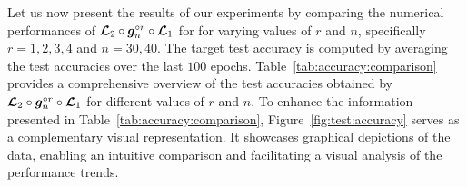 \documentclass[nohyperref]{article}
\theoremstyle{plain}
\theoremstyle{definition}
\theoremstyle{remark}
\begin{document}
Let us now present the results of our experiments by comparing the numerical performances of ${\bm{\mathcal{L}}}_2\circ {\bm{g}}_n^{\circ r}\circ {\bm{\mathcal{L}}}_1$ for 
for varying values of $r$ and $n$, specifically $r=1,2,3,4$ and $n=30,40$. 
The target test accuracy is computed by averaging the test accuracies over the last $100$ epochs.
Table~\ref{tab:accuracy:comparison} provides a comprehensive overview of the test accuracies obtained by ${\bm{\mathcal{L}}}_2\circ {\bm{g}}_n^{\circ r}\circ {\bm{\mathcal{L}}}_1$ for different values of $r$ and $n$. To enhance the information presented in Table~\ref{tab:accuracy:comparison}, Figure~\ref{fig:test:accuracy} serves as a complementary visual representation. It showcases graphical depictions of the data, enabling an intuitive comparison and facilitating a visual analysis of the performance trends.
\end{document}
